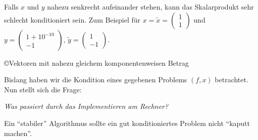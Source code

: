 \begin{Bspe}
\begin{enumerate}[a)]
    Falls $x$ und $y$ nahezu senkrecht aufeinander stehen, 
    kann das Skalarprodukt sehr schlecht konditioniert sein. 
    Zum Beispiel für $x=\widetilde{x} = \begin{pmatrix} 1 \\1 \end{pmatrix}$
    und $y=\begin{pmatrix} 1+10^{-10} \\-1 \end{pmatrix},
    \, \widetilde{y}=\begin{pmatrix} 1 \\-1 \end{pmatrix}$. \\
    \begin{image}{\copyright Vektoren mit nahezu gleichem komponentenweisen Betrag}
    \end{image}
  \end{enumerate}	
\end{Bspe}

Bislang haben wir die Kondition eines gegebenen Problems $(f,x)$ betrachtet.
Nun stellt sich die Frage:

\textit{Was passiert durch das Implementieren am Rechner? }

Ein \enquote{stabiler} Algorithmus sollte ein gut konditioniertes
Problem nicht \enquote{kaputt machen}.

